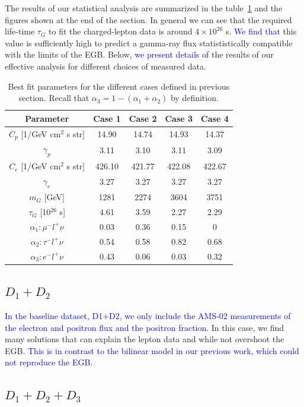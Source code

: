\documentclass[a4paper,11pt]{article}
\newcommand*{\blue}{\textcolor{blue}}
\begin{document}
The results of our statistical analysis are summarized in the table~\ref{table:best-fit-summary} and the figures shown at the end of the section. In general we can see that the required life-time $\tau_G$ to fit the charged-lepton data is around $4\times 10^{26}$ s. \blue{We find that} this value is sufficiently high to predict a gamma-ray flux statististically compatible with the limits of the EGB. Below, \blue{we present details of} the results of our effective analysis for different choices of measured data.  

\begin{table}
\centering{}%
\begin{tabular}{|c|c|c|c|c|}
\hline 
 Parameter & Case 1 & Case 2 & Case 3 & Case 4 \tabularnewline
\hline 
\hline 
$C_p$ [1/GeV cm$^2$ s str] & 14.90 & 14.74 & 14.93 & 14.37 \tabularnewline
\hline 
$\gamma_p$ & 3.11 & 3.10 & 3.11 & 3.09  \tabularnewline
\hline 
$C_e$ [1/GeV cm$^2$ s str] & 426.10 & 421.77 & 422.08 & 422.67 \tabularnewline
\hline 
$\gamma_e$ & 3.27 & 3.27 & 3.27 & 3.27 \tabularnewline
\hline 
$m_G$ [GeV] & 1281 & 2274 & 3604 & 3751 \tabularnewline
\hline 
$\tau_G$ [10$^{26}$ s] & 4.61 & 3.59 & 2.27 & 2.29  \tabularnewline
\hline 
$\alpha_1: \mu^-l^+\nu $  & 0.03 &  0.36 & 0.15 &  0 \tabularnewline
\hline 
$\alpha_2: \tau^-l^+\nu$  & 0.54 &  0.58 & 0.82 & 0.68 \tabularnewline
\hline
\hline
$\alpha_3: e^-l^+\nu$  & 0.43 &  0.06 & 0.03 & 0.32 \tabularnewline
\hline 
\end{tabular}
\caption{Best fit parameters for the different cases defined in previous section. Recall that $\alpha_3= 1-(\alpha_1+\alpha_2)$ by definition.}
\label{table:best-fit-summary}
\end{table}

\subsection{$D_1 + D_2$}

\blue{In the baseline dataset, D1+D2, we only include the AMS-02 measurements of the electron and positron flux and the positron fraction}. In this case, we find many solutions that can explain the lepton data and while not overshoot the EGB. \blue{This is in contrast to the bilinear model in our previous work, which could not reproduce the EGB}. 


\subsection{$D_1 + D_2 + D_3$}
\end{document}
